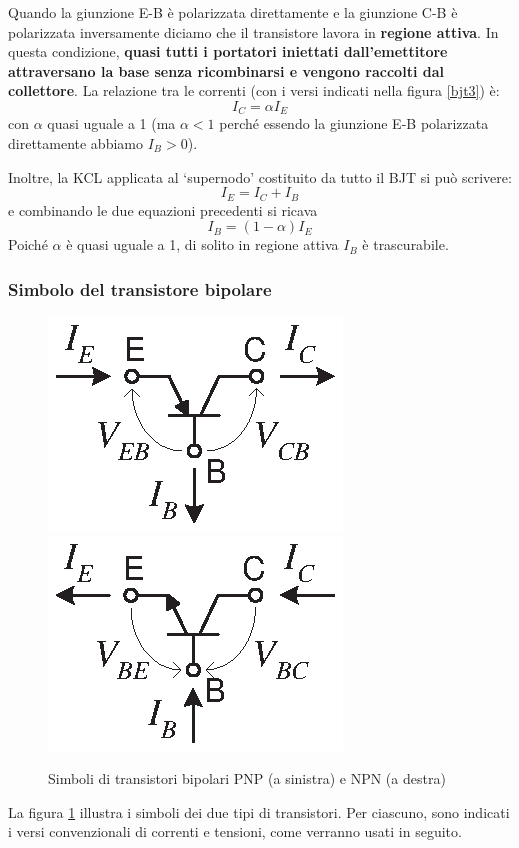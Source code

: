 \documentclass[10pt,a4paper,twoside,twocolumn]{article}
\begin{document}
Quando la giunzione E-B \`e polarizzata direttamente e la giunzione C-B \`e polarizzata inversamente
diciamo che il transistore lavora in \textbf{regione attiva}.
In questa condizione,
\textbf{quasi tutti i portatori iniettati dall'emettitore attraversano la base 
senza ricombinarsi e vengono raccolti dal collettore}.
La relazione tra le correnti (con i versi indicati nella figura \ref{bjt3}) \`e:
\begin{equation}
I_C = \alpha I_E
\label{alpha} 
\end{equation}
con $\alpha$ quasi uguale a 1 (ma $\alpha < 1$ perch\'e essendo la giunzione E-B polarizzata direttamente abbiamo $I_B > 0$).

Inoltre, la KCL applicata al `supernodo' costituito da tutto il BJT si pu\`o scrivere:
\begin{equation}
I_E = I_C + I_B
\label{kcl}
\end{equation}
e combinando le due equazioni precedenti si ricava
\begin{equation}
I_B = (1 - \alpha)I_E
\label{alpha1} 
\end{equation}
Poich\'e $\alpha$ \`e quasi uguale a 1, di solito in regione attiva $I_B$ \`e trascurabile.



\subsubsection{Simbolo del transistore bipolare}
\begin{figure}[h]
\centering
\includegraphics[width=0.35\columnwidth]{pnp1.eps}
~~~
\includegraphics[width=0.35\columnwidth]{npn1.eps}
\caption{Simboli di transistori bipolari PNP (a sinistra) e NPN (a destra)}
\label{simboli}
\end{figure}
La figura \ref{simboli} illustra  i simboli dei due tipi di transistori.
Per ciascuno, sono indicati i versi convenzionali di correnti e tensioni, come verranno usati in seguito.
\end{document}
